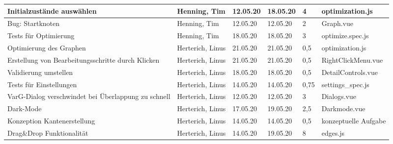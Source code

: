 \begin{longtable}{|p{4cm}|p{2cm}|p{1.2cm}|p{1.2cm}|p{0.7cm}|p{3.8cm}|}
  Initialzustände auswählen                                             & Henning, Tim          & 12.05.20 & 18.05.20 & 4     & optimization.js                                             \\ \hline
  Bug: Startknoten                                                      & Henning, Tim          & 12.05.20 & 12.05.20 & 2     & Graph.vue                                                   \\ \hline
  Tests für Optimierung                                                 & Henning, Tim          & 18.05.20 & 18.05.20 & 3     & optimize.spec.js                                            \\ \hline

  Optimierung des Graphen                                               & Herterich, Linus      & 21.05.20 & 21.05.20 & 0,5   & optimization.js                                             \\ \hline
  Erstellung von Bearbeitungsschritte durch Klicken                     & Herterich, Linus      & 21.05.20 & 21.05.20 & 0,5   & RightClickMenu.vue                                          \\ \hline
  Validierung umstellen                                                 & Herterich, Linus      & 18.05.20 & 18.05.20 & 0,5   & DetailControls.vue                                          \\ \hline
  Tests für Einstellungen                                               & Herterich, Linus      & 14.05.20 & 14.05.20 & 0,75  & settings\_spec.js                                            \\ \hline
  VarG-Dialog verschwindet bei Überlappung zu schnell                   & Herterich, Linus      & 12.05.20 & 12.05.20 & 3     & Dialogs.vue                                                 \\ \hline
  Dark-Mode                                                             & Herterich, Linus      & 17.05.20 & 19.05.20 & 2,5   & Darkmode.vue                                                \\ \hline
  Konzeption Kantenerstellung                                           & Herterich, Linus      & 14.05.20 & 14.05.20 & 0,5   & konzeptuelle Aufgabe                                        \\ \hline
  Drag\&Drop Funktionalität                                              & Herterich, Linus      & 14.05.20 & 19.05.20 & 8     & edges.js                                                    \\ \hline

\end{longtable}
